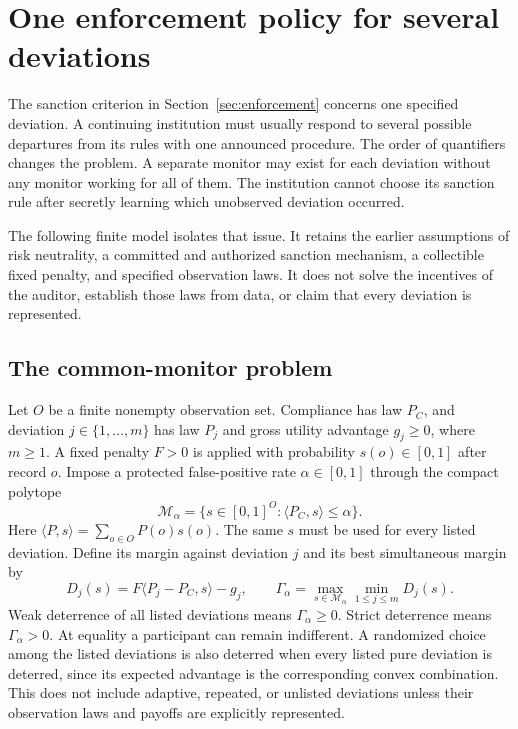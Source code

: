 \documentclass[11pt,letterpaper]{article}
\theoremstyle{plain}
\theoremstyle{definition}
\theoremstyle{remark}
\begin{document}
\section{One enforcement policy for several deviations}\label{sec:joint-enforcement}
The sanction criterion in Section~\ref{sec:enforcement} concerns one specified deviation. A continuing institution must usually respond to several possible departures from its rules with one announced procedure. The order of quantifiers changes the problem. A separate monitor may exist for each deviation without any monitor working for all of them. The institution cannot choose its sanction rule after secretly learning which unobserved deviation occurred.

The following finite model isolates that issue. It retains the earlier assumptions of risk neutrality, a committed and authorized sanction mechanism, a collectible fixed penalty, and specified observation laws. It does not solve the incentives of the auditor, establish those laws from data, or claim that every deviation is represented.

\subsection{The common-monitor problem}
Let $O$ be a finite nonempty observation set. Compliance has law $P_C$, and deviation $j\in\{1,\ldots,m\}$ has law $P_j$ and gross utility advantage $g_j\geq0$, where $m\geq1$. A fixed penalty $F>0$ is applied with probability $s(o)\in[0,1]$ after record $o$. Impose a protected false-positive rate $\alpha\in[0,1]$ through the compact polytope
\[
\mathcal M_\alpha=\{s\in[0,1]^O:\langle P_C,s\rangle\leq\alpha\}.
\]
Here $\langle P,s\rangle=\sum_{o\in O}P(o)s(o)$. The same $s$ must be used for every listed deviation. Define its margin against deviation $j$ and its best simultaneous margin by
\begin{equation}\label{eq:joint-margin}
D_j(s)=F\langle P_j-P_C,s\rangle-g_j,
\qquad
\Gamma_\alpha=\max_{s\in\mathcal M_\alpha}\min_{1\leq j\leq m}D_j(s).
\end{equation}
Weak deterrence of all listed deviations means $\Gamma_\alpha\geq0$. Strict deterrence means $\Gamma_\alpha>0$. At equality a participant can remain indifferent. A randomized choice among the listed deviations is also deterred when every listed pure deviation is deterred, since its expected advantage is the corresponding convex combination. This does not include adaptive, repeated, or unlisted deviations unless their observation laws and payoffs are explicitly represented.
\end{document}
